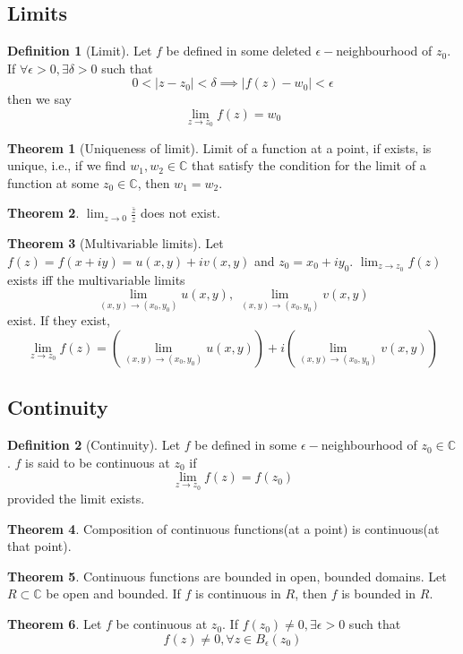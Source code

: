 \documentclass[10pt, a4paper]{extarticle}
\theoremstyle{definition}
\newtheorem{thm}{Theorem}
\newtheorem{defn}{Definition}
\begin{document}
	\subsection{Limits}
	\begin{defn}[Limit]
		Let $f$ be defined in some deleted $\epsilon-$neighbourhood of $z_0$. If $\forall \epsilon>0,\exists\delta>0$ such that
		\[0<|z-z_0|<\delta\implies|f(z)-w_0|<\epsilon\]
		then we say
		\[\lim_{z\to z_0}f(z)=w_0\]

	\end{defn}
	\begin{thm}[Uniqueness of limit]
		Limit of a function at a point, if exists, is unique, i.e., if we find $w_1,w_2\in\mathbb{C}$ that satisfy the condition for the limit of a function at some $z_0\in\mathbb{C}$, then $w_1=w_2$.
	\end{thm}
	\begin{thm}
		$\lim_{z\to 0}\frac{\bar{z}}{z}$ does not exist.
	\end{thm}
	\begin{thm}[Multivariable limits]
		Let $f(z)=f(x+iy)=u(x,y)+iv(x,y)$ and $z_0=x_0+iy_0$. $\lim_{z\to z_0}f(z)$ exists iff the multivariable limits
		\[\lim_{(x,y)\to(x_0,y_0)}u(x,y),\ \lim_{(x,y)\to(x_0,y_0)}v(x,y)\]
		exist. If they exist,
		\[\lim_{z\to z_0}f(z)=\left(\lim_{(x,y)\to(x_0,y_0)}u(x,y)\right)+i\left(\lim_{(x,y)\to(x_0,y_0)}v(x,y)\right)\]
	\end{thm}

	\subsection{Continuity}
	\begin{defn}[Continuity]
		Let $f$ be defined in some $\epsilon-$neighbourhood of $z_0\in\mathbb{C}$. $f$ is said to be continuous at $z_0$ if
		\[\lim_{z\to z_0}f(z)=f(z_0)\]
		provided the limit exists.
	\end{defn}
	\begin{thm}
		Composition of continuous functions(at a point) is continuous(at that point).
	\end{thm}
	\begin{thm}\label{bound}
		Continuous functions are bounded in open, bounded domains.
		Let $R\subset\mathbb{C}$ be open and bounded. If $f$ is continuous in $R$, then $f$ is bounded in $R$.
	\end{thm}
	\begin{thm}
		Let $f$ be continuous at $z_0$. If $f(z_0)\neq0,\exists \epsilon>0$ such that 
		\[f(z)\neq 0,\forall z\in B_\epsilon(z_0)\]
	\end{thm}
	
\end{document}
